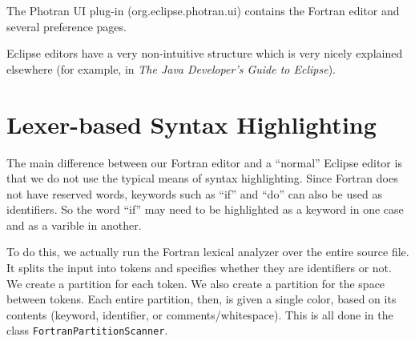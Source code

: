
The Photran UI plug-in (org.eclipse.photran.ui) contains the Fortran editor
and several preference pages.

Eclipse editors have a very non-intuitive structure which is very nicely
explained elsewhere (for example, in \textit{The Java Developer's Guide
to Eclipse}).

\section{Lexer-based Syntax Highlighting}

The main difference between our Fortran editor and a ``normal'' Eclipse
editor is that we do not use the typical means of syntax highlighting.
Since Fortran does not have reserved words, keywords such as ``if'' and
``do'' can also be used as identifiers.  So the word ``if'' may need
to be highlighted as a keyword in one case and as a varible in another.

To do this, we actually run the Fortran lexical analyzer over the entire
source file.  It splits the input into tokens and specifies whether they
are identifiers or not.  We create a partition for each token.  We also
create a partition for the space between tokens.  Each entire partition,
then, is given a single color, based on its contents (keyword, identifier,
or comments/whitespace).  This is all done in the class
\texttt{FortranPartitionScanner}.
